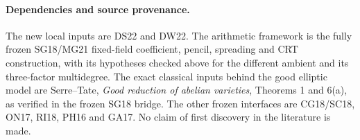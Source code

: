 \paragraph{Dependencies and source provenance.}
The new local inputs are DS22 and DW22.  The arithmetic framework
is the fully frozen SG18/MG21 fixed-field coefficient, pencil,
spreading and CRT construction, with its hypotheses checked above
for the different ambient and its three-factor multidegree.
The exact classical inputs behind the good elliptic model are
Serre--Tate, \emph{Good reduction of abelian varieties}, Theorems
1 and 6(a), as verified in the frozen SG18 bridge.  The other
frozen interfaces are CG18/SC18, ON17, RI18, PH16 and GA17.
No claim of first discovery in the literature is made.
